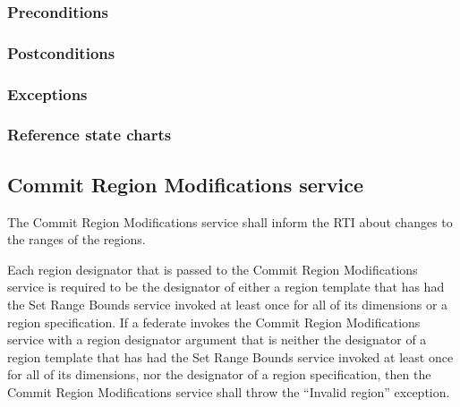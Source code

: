 \begin{compactstdpage}

    \subsubsection{Preconditions}


    \subsubsection{Postconditions}


    \subsubsection{Exceptions}


    \subsubsection{Reference state charts}


    \subsection{Commit Region Modifications service}

    The Commit Region Modifications service shall inform the RTI about changes to the ranges of the regions.

    Each region designator that is passed to the Commit Region Modifications service is required to be the designator of either a region template that has had the Set Range Bounds service invoked at least once for all of its dimensions or a region specification. If a federate invokes the Commit Region Modifications service with a region designator argument that is neither the designator of a region template that has had the Set Range Bounds service invoked at least once for all of its dimensions, nor the designator of a region specification, then the Commit Region Modifications service shall throw the ``Invalid region'' exception.


\end{compactstdpage}
